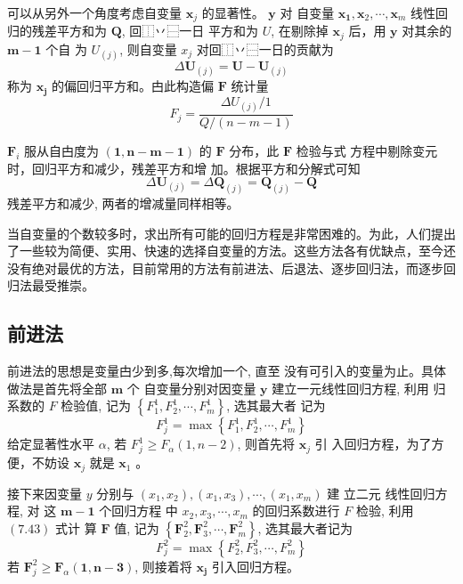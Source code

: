 可以从另外一个角度考虑自变量 \( \boldsymbol{x}_{j} \) 的显著性。 \( \boldsymbol{y} \) 对 自变量 \( \boldsymbol{x}_{\mathbf{1}}, \boldsymbol{x}_{2}, \cdots, \boldsymbol{x}_{m} \) 线性回归的残差平方和为 \( \boldsymbol{Q} \), 回⿰丷⿱一日
平方和为 \( U \), 在剔除掉 \( \boldsymbol{x}_{j} \) 后，用 \( \boldsymbol{y} \) 对其余的 \( \boldsymbol{m}-\mathbf{1} \) 个自
为 \( U_{(j)} \), 则自变量 \( x_{j} \) 对回⿰丷⿱一日的贡献为
$$
\Delta \boldsymbol{U}_{(j)}=\boldsymbol{U}-\boldsymbol{U}_{(j)}
$$
称为 \( \boldsymbol{x}_{\boldsymbol{j}} \) 的偏回归平方和。甴此构造偏 \( \boldsymbol{F} \) 统计量
$$
F_{j}=\frac{\Delta U_{(j)} / 1}{Q /(n-m-1)}
$$

\( \boldsymbol{F}_{i} \) 服从自甴度为 \( (\mathbf{1}, \boldsymbol{n}-\boldsymbol{m}-\mathbf{1}) \) 的 \( \boldsymbol{F} \) 分布，此 \( \boldsymbol{F} \) 检验与式
方程中剔除变元时，回归平方和减少，残差平方和增 加。根据平方和分解式可知
$$
\Delta \boldsymbol{U}_{(j)}=\Delta \boldsymbol{Q}_{(j)}=\boldsymbol{Q}_{(j)}-\boldsymbol{Q}
$$
残差平方和减少, 两者的增减量同样相等。

当自变量的个数较多时，求出所有可能的回归方程是非常困难的。为此，人们提出了一些较为简便、实用、快速的选择自变量的方法。这些方法各有优缺点，至今还没有绝对最优的方法，目前常用的方法有前进法、后退法、逐步回归法，而逐步回归法最受推崇。

\subsection{前进法}

前进法的思想是变量甴少到多,每次增加一个, 直至
没有可引入的变量为止。具体做法是首先将全部 \( \boldsymbol{m} \) 个 自变量分别对因变量 \( \boldsymbol{y} \) 建立一元线性回归方程, 利用
归系数的 \( F \) 检验值, 记为 \( \left\{F_{1}^{1}, F_{2}^{1}, \cdots, F_{m}^{1}\right\} \), 选其最大者 记为
$$
F_{j}^{1}=\max \left\{F_{1}^{1}, F_{2}^{1}, \cdots, F_{m}^{1}\right\}
$$
给定显著性水平 \( \alpha \), 若 \( F_{j}^{1} \geq F_{\alpha}(1, n-2) \), 则首先将 \( \boldsymbol{x}_{j} \) 引 入回归方程，为了方便，不妨设 \( \boldsymbol{x}_{j} \) 就是 \( \boldsymbol{x}_{1} \) 。

接下来因变量 \( y \) 分别与 \( \left(x_{1}, x_{2}\right),\left(x_{1}, x_{3}\right), \cdots,\left(x_{1}, x_{m}\right) \) 建
立二元 线性回归方程, 对 这 \( \boldsymbol{m}-\mathbf{1} \) 个回归方程 中 \( x_{2}, x_{3}, \cdots, x_{m} \) 的回归系数进行 \( F \) 检验, 利用 \( (7.43) \) 式计 算 \( \boldsymbol{F} \) 值, 记为 \( \left\{\boldsymbol{F}_{2}^{2}, \boldsymbol{F}_{3}^{2}, \cdots, \boldsymbol{F}_{m}^{2}\right\} \), 选其最大者记为
$$
F_{j}^{2}=\max \left\{F_{2}^{2}, F_{3}^{2}, \cdots, F_{m}^{2}\right\}
$$
若 \( \boldsymbol{F}_{j}^{2} \geq \boldsymbol{F}_{\alpha} \mathbf{( 1 , n - 3 )} \), 则接着将 \( \boldsymbol{x}_{\boldsymbol{j}} \) 引入回归方程。

